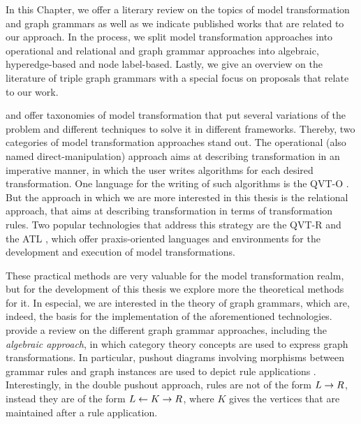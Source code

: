 
In this Chapter, we offer a literary review on the topics of model transformation and graph grammars as well as we indicate published works that are related to our approach. In the process, we split model transformation approaches into operational and relational and graph grammar approaches into algebraic, hyperedge-based and node label-based. Lastly, we give an overview on the literature of triple graph grammars with a special focus on proposals that relate to our work.

\citep{mens2006taxonomy} and \citep{czarnecki2003classification} offer taxonomies of model transformation that put several variations of the problem and different techniques to solve it in different frameworks. Thereby, two categories of model transformation approaches stand out. The operational (also named direct-manipulation) approach aims at describing transformation in an imperative manner, in which the user writes algorithms for each desired transformation. One language for the writing of such algorithms is the QVT-O \cite{omg2008meta}. But the approach in which we are more interested in this thesis is the relational approach, that aims at describing transformation in terms of transformation rules. Two popular technologies that address this strategy are the QVT-R \cite{omg2008meta} and the ATL \cite{jouault2006atl}, which offer praxis-oriented languages and environments for the development and execution of model transformations.

These practical methods are very valuable for the model transformation realm, but for the development of this thesis we explore more the theoretical methods for it. In especial, we are interested in the theory of graph grammars, which are, indeed, the basis for the implementation of the aforementioned technologies. \citep{ehrig1999handbook} provide a review on the different graph grammar approaches, including the \emph{algebraic approach}, in which category theory concepts are used to express graph transformations. In particular, pushout diagrams involving morphisms between grammar rules and graph instances are used to depict rule applications \cite{corradini1997algebraic}. Interestingly, in the double pushout approach, rules are not of the form $L \to R$, instead they are of the form $L \leftarrow K \to R$, where $K$ gives the vertices that are maintained after a rule application.

